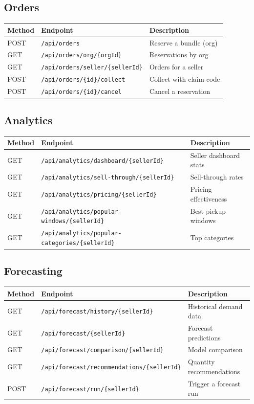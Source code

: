 \documentclass[a4paper,11pt]{article}
\begin{document}
\subsection{Orders}

\begin{tabular}{l l l}
\toprule
Method & Endpoint & Description \\
\midrule
POST & \texttt{/api/orders} & Reserve a bundle (org) \\
GET & \texttt{/api/orders/org/\{orgId\}} & Reservations by org \\
GET & \texttt{/api/orders/seller/\{sellerId\}} & Orders for a seller \\
POST & \texttt{/api/orders/\{id\}/collect} & Collect with claim code \\
POST & \texttt{/api/orders/\{id\}/cancel} & Cancel a reservation \\
\bottomrule
\end{tabular}

\subsection{Analytics}

\begin{tabular}{l l l}
\toprule
Method & Endpoint & Description \\
\midrule
GET & \texttt{/api/analytics/dashboard/\{sellerId\}} & Seller dashboard stats \\
GET & \texttt{/api/analytics/sell-through/\{sellerId\}} & Sell-through rates \\
GET & \texttt{/api/analytics/pricing/\{sellerId\}} & Pricing effectiveness \\
GET & \texttt{/api/analytics/popular-windows/\{sellerId\}} & Best pickup windows \\
GET & \texttt{/api/analytics/popular-categories/\{sellerId\}} & Top categories \\
\bottomrule
\end{tabular}

\subsection{Forecasting}

\begin{tabular}{l l l}
\toprule
Method & Endpoint & Description \\
\midrule
GET & \texttt{/api/forecast/history/\{sellerId\}} & Historical demand data \\
GET & \texttt{/api/forecast/\{sellerId\}} & Forecast predictions \\
GET & \texttt{/api/forecast/comparison/\{sellerId\}} & Model comparison \\
GET & \texttt{/api/forecast/recommendations/\{sellerId\}} & Quantity recommendations \\
POST & \texttt{/api/forecast/run/\{sellerId\}} & Trigger a forecast run \\
\bottomrule
\end{tabular}
\end{document}
